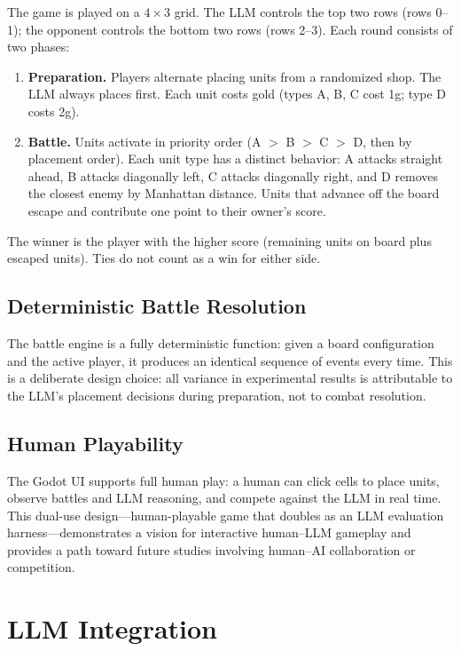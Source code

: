 \documentclass[11pt]{article}
\begin{document}
The game is played on a $4 \times 3$ grid.
The LLM controls the top two rows (rows 0--1); the opponent controls the bottom two rows (rows 2--3).
Each round consists of two phases:

\begin{enumerate}[nosep]
    \item \textbf{Preparation.} Players alternate placing units from a randomized shop. The LLM always places first. Each unit costs gold (types A, B, C cost 1g; type D costs 2g).
    \item \textbf{Battle.} Units activate in priority order (A $>$ B $>$ C $>$ D, then by placement order). Each unit type has a distinct behavior: A attacks straight ahead, B attacks diagonally left, C attacks diagonally right, and D removes the closest enemy by Manhattan distance. Units that advance off the board escape and contribute one point to their owner's score.
\end{enumerate}

The winner is the player with the higher score (remaining units on board plus escaped units).
Ties do not count as a win for either side.

\subsection{Deterministic Battle Resolution}

The battle engine is a fully deterministic function: given a board configuration and the active player, it produces an identical sequence of events every time.
This is a deliberate design choice: all variance in experimental results is attributable to the LLM's placement decisions during preparation, not to combat resolution.

\subsection{Human Playability}

The Godot UI supports full human play: a human can click cells to place units, observe battles and LLM reasoning, and compete against the LLM in real time.
This dual-use design---human-playable game that doubles as an LLM evaluation harness---demonstrates a vision for interactive human--LLM gameplay and provides a path toward future studies involving human--AI collaboration or competition.

\section{LLM Integration}\label{sec:llm}
\end{document}
